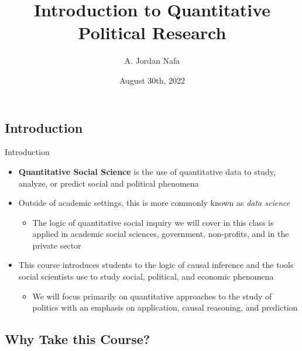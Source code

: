\documentclass[12pt,ignorenonframetext,aspectratio=169]{beamer}
\author{A. Jordan Nafa}
\title[PSCI 3300 Political Science Research Methods]{Introduction to
Quantitative Political Research}
\institute[University of North Texas]{
	\normalsize{University of North Texas\\ 
		Department of Political Science}
}
\date{August 30th, 2022}
\providecommand{\tightlist}{%
	\setlength{\itemsep}{0.25em}\setlength{\parskip}{0pt}}
\begin{document}
	
	\begin{frame}
		\maketitle
	\end{frame}

\hypertarget{introduction}{%
\subsection{Introduction}\label{introduction}}

\begin{frame}{Introduction}
\begin{itemize}[<+->]
\item
  \textbf{Quantitative Social Science} is the use of quantitative data
  to study, analyze, or predict social and political phenomena
\item
  Outside of academic settings, this is more commonly known as
  \emph{data science}

  \begin{itemize}[<+->]
  \tightlist
  \item
    The logic of quantitative social inquiry we will cover in this class
    is applied in academic social sciences, government, non-profits, and
    in the private sector
  \end{itemize}
\item
  This course introduces students to the logic of causal inference and
  the tools social scientists use to study social, political, and
  economic phenomena

  \begin{itemize}[<+->]
  \tightlist
  \item
    We will focus primarily on quantitative approaches to the study of
    politics with an emphasis on application, causal reasoning, and
    prediction
  \end{itemize}
\end{itemize}
\end{frame}

\hypertarget{why-take-this-course}{%
\subsection{Why Take this Course?}\label{why-take-this-course}}
\end{document}
